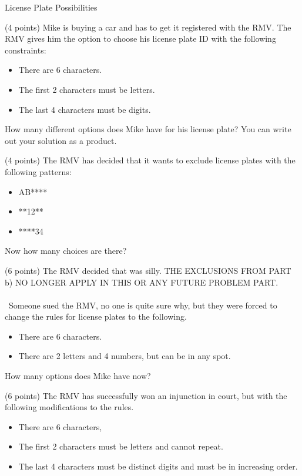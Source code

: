 \documentclass[11pt]{article}
\begin{document}
 \begin{problem}
 License Plate Possibilities

 \begin{ppart} (4 points)
     Mike is buying a car and has to get it registered with the RMV. The RMV gives him the option to choose his license plate ID with the following constraints:
     \begin{itemize}
         \item There are 6 characters.
         \item The first 2 characters must be letters.
         \item The last 4 characters must be digits.
     \end{itemize}

     How many different options does Mike have for his license plate? You can write out your solution as a product.

   
 \end{ppart}

\begin{ppart} (4 points)
The RMV has decided that it wants to exclude license plates with the following patterns:

\begin{itemize}
\item AB****
\item **12**
\item ****34
\end{itemize}

Now how many choices are there?
\end{ppart}

 \begin{ppart} (6 points)
    The RMV decided that was silly. THE EXCLUSIONS FROM PART b) NO LONGER APPLY IN THIS OR ANY FUTURE PROBLEM PART.
\\\\\
Someone sued the RMV, no one is quite sure why, but they were forced to change the rules for license plates to the following.
     \begin{itemize}
         \item There are 6 characters.
         \item There are 2 letters and 4 numbers, but can be in any spot.
     \end{itemize}

     How many options does Mike have now?

    
 \end{ppart}

 \begin{ppart} (6 points)
     The RMV has successfully won an injunction in court, but with the following modifications to the rules.
     \begin{itemize}
         \item There are 6 characters,
         \item The first 2 characters must be letters and cannot repeat.
         \item The last 4 characters must be distinct digits and must be in increasing order.
     \end{itemize}


\end{ppart}
\end{problem}
\end{document}
